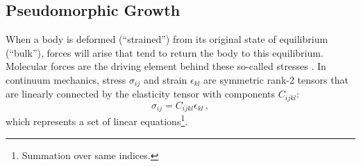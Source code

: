\subsection{Pseudomorphic Growth}
\label{sec:Theory_PseudomorphicGrowth}
When a body is deformed (\enquote{strained}) from its original state of equilibrium (\enquote{bulk}), forces will arise that tend to return the body to this equilibrium.
Molecular forces are the driving element behind these so-called stresses
    \cite{landau1970}.
In continuum mechanics, stress $\sigma_{ij}$ and strain $\epsilon_{kl}$ are symmetric rank-2 tensors that are linearly connected by the elasticity tensor with components $C_{ijkl}$:
\begin{equation}\label{equ:stress-strain}
    \sigma_{ij}=C_{ijkl}\epsilon_{kl}\,,
\end{equation}
which represents a set of linear equations\footnote{
    Summation over same indices.%
}.

